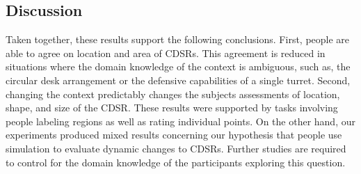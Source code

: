 \documentclass[11pt,letterpaper]{article}
\begin{document}
%
% 

%
%
%
 
\subsection{Discussion}
Taken together, these results support the following conclusions. First, people are able to agree on location and area of CDSRs.  This agreement is reduced in situations where the domain knowledge of the context is ambiguous, such as, the circular desk arrangement or the defensive capabilities of a single turret.  Second, changing the context predictably changes the subjects assessments of location, shape, and size of the CDSR.  These results were supported by tasks involving people labeling regions as well as rating individual points.  On the other hand, our experiments produced mixed results concerning our hypothesis that people use simulation to evaluate dynamic changes to CDSRs.  Further studies are required to control for the domain knowledge of the participants exploring this question.
\end{document}
